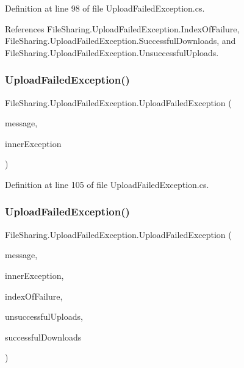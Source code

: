 Definition at line 98 of file Upload\+Failed\+Exception.\+cs.



References File\+Sharing.\+Upload\+Failed\+Exception.\+Index\+Of\+Failure, File\+Sharing.\+Upload\+Failed\+Exception.\+Successful\+Downloads, and File\+Sharing.\+Upload\+Failed\+Exception.\+Unsuccessful\+Uploads.

\mbox{\label{class_file_sharing_1_1_upload_failed_exception_ad121124c4e8c37f2b1f686715e903450}} 
\subsubsection{\texorpdfstring{Upload\+Failed\+Exception()}{UploadFailedException()}\hspace{0.1cm}{\footnotesize\ttfamily [5/7]}}
{\footnotesize\ttfamily File\+Sharing.\+Upload\+Failed\+Exception.\+Upload\+Failed\+Exception (\begin{DoxyParamCaption}\item[{string}]{message,  }\item[{Exception}]{inner\+Exception }\end{DoxyParamCaption})}



Definition at line 105 of file Upload\+Failed\+Exception.\+cs.

\mbox{\label{class_file_sharing_1_1_upload_failed_exception_a1366a7120744fb9caa67e16e85f2c681}} 
\subsubsection{\texorpdfstring{Upload\+Failed\+Exception()}{UploadFailedException()}\hspace{0.1cm}{\footnotesize\ttfamily [6/7]}}
{\footnotesize\ttfamily File\+Sharing.\+Upload\+Failed\+Exception.\+Upload\+Failed\+Exception (\begin{DoxyParamCaption}\item[{string}]{message,  }\item[{Exception}]{inner\+Exception,  }\item[{int}]{index\+Of\+Failure,  }\item[{I\+Enumerable$<$ Byte\mbox{[}$\,$\mbox{]}$>$}]{unsuccessful\+Uploads,  }\item[{I\+Enumerable$<$ string $>$}]{successful\+Downloads }\end{DoxyParamCaption})}



